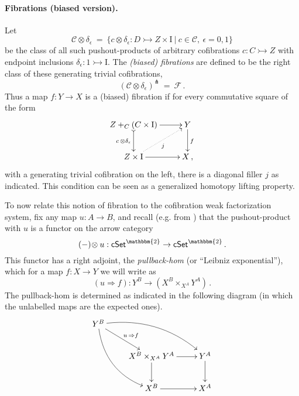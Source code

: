 \documentclass[11pt]{article}
\newcommand{\cSet}{\ensuremath{\mathsf{cSet}}}
\newcommand{\mono}{\ensuremath{\rightarrowtail}}
\newcommand{\I}{\ensuremath{\mathrm{I}}}
\newtheorem{proposition}[theorem]{Proposition}
\theoremstyle{remark}
\theoremstyle{definition}
\begin{document}
\paragraph{Fibrations (biased version).}
Let 
\[
\mathcal{C}\otimes \delta_\epsilon\ =\ \{ c \otimes \delta_\epsilon : D \mono Z \times \I\ |\ c \in\mathcal{C},\ \epsilon = 0,1 \}
\]
be the class of all such pushout-products of arbitrary cofibrations $c : C \mono Z$ with endpoint inclusions $\delta_\epsilon : 1 \mono \I$.
The \emph{(biased) fibrations} are defined to be the right class of these generating trivial cofibrations,
\[
(\mathcal{C}\otimes \delta_\epsilon)^\pitchfork\ =\ \mathcal{F}\,.
\]
Thus a map $f : Y\to X$ is a (biased) fibration if for every commutative square of the form
\begin{equation}\label{diagram:biasedfillers}
\xymatrix{
Z +_C (C\times\I) \ar@{>->}[d]_{c\, \otimes \delta_\epsilon} \ar[r] & Y \ar[d]^f \\
Z\times \I \ar@{.>}[ru]_{j} \ar[r] & X\,,
}
\end{equation}
with a generating trivial cofibration on the left, there is a diagonal filler $j$ as indicated. This condition can be seen as a generalized homotopy lifting property.

To now relate this notion of fibration to the cofibration weak factorization system, fix any map $u : A \to B$, and recall (e.g. from \cite{R}) that the pushout-product with $u$ is a functor on the arrow category 
\[
(-)\!\otimes u : \cSet^\mathbbm{2} \to\cSet^\mathbbm{2}\,.
\]
This functor has a right adjoint, the \emph{pullback-hom} (or ``Leibniz exponential''), which for a map $f : X\to Y$ we will write as
\[
(u \Rightarrow\! f) : Y^B \to (X^B \times_{X^A} Y^A) \,.
\]
The pullback-hom is determined as indicated in the following diagram (in which the unlabelled maps are the expected ones).
\begin{equation}\label{diagram:pullbackhom}
\xymatrix{
Y^B \ar@/_4ex/ [rdd] \ar[rd]^{u\, \Rightarrow f} \ar@/^4ex/ [rrd] && \\
& X^B \times_{X^A} Y^A \ar[d] \ar[r] & Y^A \ar[d] \\
& X^B \ar[r] &  X^A 
}
\end{equation}
\end{document}
